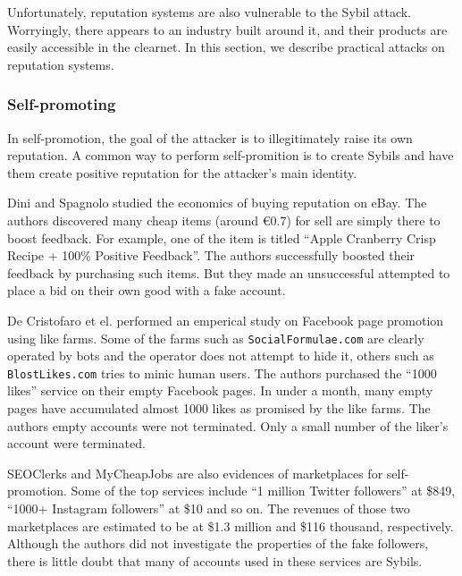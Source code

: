 Unfortunately, reputation systems are also vulnerable to the Sybil attack.
Worryingly, there appears to an industry built around it, and their products are
easily accessible in the clearnet. In this section, we describe practical
attacks on reputation systems.

\subsubsection{Self-promoting}
In self-promotion, the goal of the attacker is to illegitimately raise its own
reputation. A common way to perform self-promition is to create Sybils and have
them create positive reputation for the attacker's main identity.

Dini and Spagnolo studied the economics of buying reputation on eBay. The
authors discovered many cheap items (around \euro{0.7}) for sell are simply there to
boost feedback. For example, one of the item is titled ``Apple Cranberry Crisp
Recipe + 100\% Positive Feedback''. The authors successfully boosted their
feedback by purchasing such items. But they made an unsuccessful attempted to
place a bid on their own good with a fake account\cite{dini2009buying}.


De Cristofaro et el. performed an emperical study on Facebook page promotion
using like farms\cite{de2014paying}. Some of the farms such as
\verb!SocialFormulae.com! are clearly operated by bots and the operator does not
attempt to hide it, others such as \verb!BlostLikes.com! tries to minic human
users. The authors purchased the ``1000 likes'' service on their empty Facebook pages.
In under a month, many empty pages have accumulated almost 1000 likes as
promised by the like farms. The authors empty accounts were not terminated. Only
a small number of the liker's account were terminated.


SEOClerks and MyCheapJobs are also evidences of marketplaces for self-promotion.
Some of the top services include ``1 million Twitter followers'' at \$849,
``1000+ Instagram followers'' at \$10 and so on. The revenues of those two
marketplaces are estimated to be at \$1.3 million and \$116 thousand,
respectively\cite{farooqi2015characterizing}. Although the authors did not
investigate the properties of the fake followers, there is little doubt that
many of accounts used in these services are Sybils.

